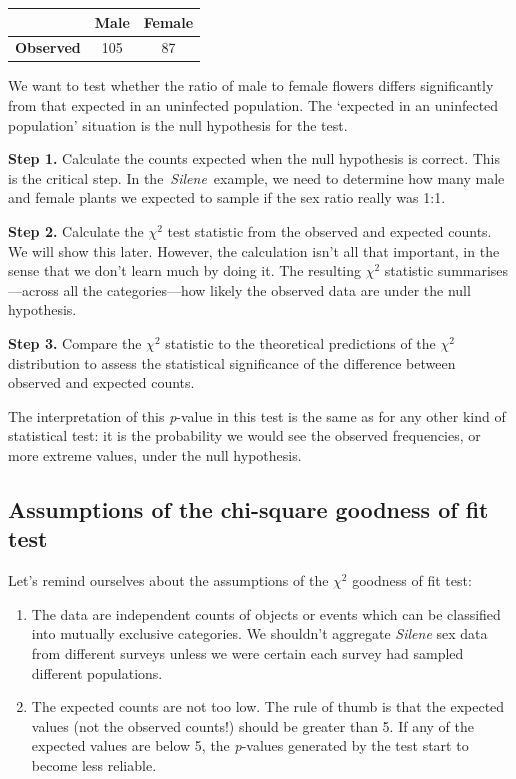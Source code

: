 \documentclass[
]{book}
\begin{document}
\begin{longtable}[]{@{}lcc@{}}
\toprule()
& Male & Female \\
\midrule()
\endhead
\textbf{Observed} & 105 & 87 \\
\bottomrule()
\end{longtable}

We want to test whether the ratio of male to female flowers differs significantly from that expected in an uninfected population. The `expected in an uninfected population' situation is the null hypothesis for the test.

\textbf{Step 1.} Calculate the counts expected when the null hypothesis is correct. This is the critical step. In the~\emph{Silene}~example, we need to determine how many male and female plants we expected to sample if the sex ratio really was 1:1.

\textbf{Step 2.} Calculate the \(\chi^{2}\) test statistic from the observed and expected counts. We will show this later. However, the calculation isn't all that important, in the sense that we don't learn much by doing it. The resulting \(\chi^{2}\) statistic summarises---across all the categories---how likely the observed data are under the null hypothesis.

\textbf{Step 3.} Compare the \(\chi^{2}\) statistic to the theoretical predictions of the \(\chi^{2}\) distribution to assess the statistical significance of the difference between observed and expected counts.

The interpretation of this \emph{p}-value in this test is the same as for any other kind of statistical test: it is the probability we would see the observed frequencies, or more extreme values, under the null hypothesis.

\hypertarget{assumptions-of-the-chi-square-goodness-of-fit-test}{%
\subsection{Assumptions of the chi-square goodness of fit test}\label{assumptions-of-the-chi-square-goodness-of-fit-test}}

Let's remind ourselves about the assumptions of the \(\chi^{2}\) goodness of fit test:

\begin{enumerate}
\def\labelenumi{\arabic{enumi}.}
\item
  The data are independent counts of objects or events which can be classified into mutually exclusive categories. We shouldn't aggregate \emph{Silene} sex data from different surveys unless we were certain each survey had sampled different populations.
\item
  The expected counts are not too low. The rule of thumb is that the expected values (not the observed counts!) should be greater than 5. If any of the expected values are below 5, the \emph{p}-values generated by the test start to become less reliable.
\end{enumerate}
\end{document}
